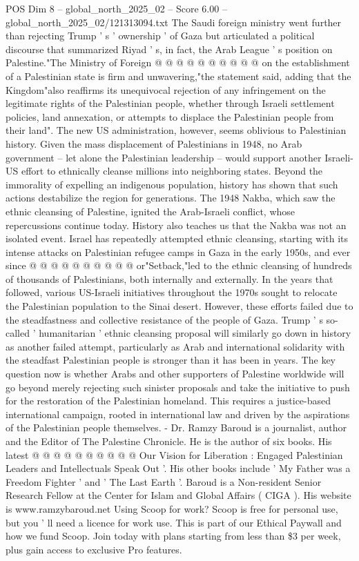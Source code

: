 \begin{textsample}{POS Dim 8 – global\_north\_2025\_02 – Score 6.00 – global\_north\_2025\_02/121313094.txt}
The Saudi foreign ministry went further than rejecting Trump ' s ' ownership ' of Gaza but articulated a political discourse that summarized Riyad ' s, in fact, the Arab League ' s position on Palestine."The Ministry of Foreign @ @ @ @ @ @ @ @ @ @ on the establishment of a Palestinian state is firm and unwavering,"the statement said, adding that the Kingdom"also reaffirms its unequivocal rejection of any infringement on the legitimate rights of the Palestinian people, whether through Israeli settlement policies, land annexation, or attempts to displace the Palestinian people from their land".
The new US administration, however, seems oblivious to Palestinian history.
Given the mass displacement of Palestinians in 1948, no Arab government -- let alone the Palestinian leadership -- would support another Israeli-US effort to ethnically cleanse millions into neighboring states.
Beyond the immorality of expelling an indigenous population, history has shown that such actions destabilize the region for generations.
The 1948 Nakba, which saw the ethnic cleansing of Palestine, ignited the Arab-Israeli conflict, whose repercussions continue today.
History also teaches us that the Nakba was not an isolated event.
Israel has repeatedly attempted ethnic cleansing, starting with its intense attacks on Palestinian refugee camps in Gaza in the early 1950s, and ever since @ @ @ @ @ @ @ @ @ @ or"Setback,"led to the ethnic cleansing of hundreds of thousands of Palestinians, both internally and externally.
In the years that followed, various US-Israeli initiatives throughout the 1970s sought to relocate the Palestinian population to the Sinai desert.
However, these efforts failed due to the steadfastness and collective resistance of the people of Gaza.
Trump ' s so-called ' humanitarian ' ethnic cleansing proposal will similarly go down in history as another failed attempt, particularly as Arab and international solidarity with the steadfast Palestinian people is stronger than it has been in years.
The key question now is whether Arabs and other supporters of Palestine worldwide will go beyond merely rejecting such sinister proposals and take the initiative to push for the restoration of the Palestinian homeland.
This requires a justice-based international campaign, rooted in international law and driven by the aspirations of the Palestinian people themselves. - Dr.
Ramzy Baroud is a journalist, author and the Editor of The Palestine Chronicle.
He is the author of six books.
His latest @ @ @ @ @ @ @ @ @ @ Our Vision for Liberation : Engaged Palestinian Leaders and Intellectuals Speak Out '.
His other books include ' My Father was a Freedom Fighter ' and ' The Last Earth '.
Baroud is a Non-resident Senior Research Fellow at the Center for Islam and Global Affairs ( CIGA ).
His website is www.ramzybaroud.net Using Scoop for work?
Scoop is free for personal use, but you ' ll need a licence for work use.
This is part of our Ethical Paywall and how we fund Scoop.
Join today with plans starting from less than \$3 per week, plus gain access to exclusive Pro features.

\end{textsample}
